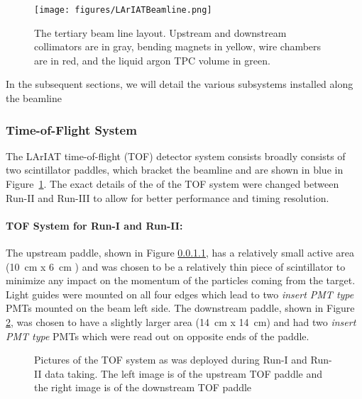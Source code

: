 \begin{figure}[!h]
\begin{centering}
\vspace{-0.3cm}
\texttt{[image: figures/LArIATBeamline.png]}
\caption{
{\scriptsize \sf The tertiary beam line layout. Upstream and downstream collimators are in gray, bending magnets in yellow, wire chambers are in red, and the liquid argon TPC volume in green.}
}
\label{fig:tert-layout}
\end{centering}
\end{figure}

In the subsequent sections, we will detail the various subsystems installed along the beamline

\subsubsection{Time-of-Flight System}\label{sec:TOF}

The LArIAT time-of-flight (TOF) detector system consists broadly consists of two scintillator paddles, which bracket the beamline and are shown in blue in Figure~\ref{fig:tert-layout}. The exact details of the of the TOF system were changed between Run-II and Run-III to allow for better performance and timing resolution.

\paragraph{\textbf{TOF System for Run-I and Run-II:}}
The upstream paddle, shown in Figure \ref{}, has a relatively small active area (10~cm x 6~cm ) and was chosen to be a relatively thin piece of scintillator to minimize any impact on the momentum of the particles coming from the target. Light guides were mounted on all four edges which lead to two \textit{insert PMT type} PMTs mounted on the beam left side. The downstream paddle, shown in Figure \ref{fig:TOFSystemRunIandII}, was chosen to have a slightly larger area (14~cm x 14~cm) and had two \textit{insert PMT type} PMTs which were read out on opposite ends of the paddle.

\begin{figure}[!h]
\begin{centering}
\vspace{-0.3cm}
\caption{
{\scriptsize \sf Pictures of the TOF system as was deployed during Run-I and Run-II data taking. The left image is of the upstream TOF paddle and the right image is of the downstream TOF paddle }
}
\label{fig:TOFSystemRunIandII}
\end{centering}
\end{figure}

